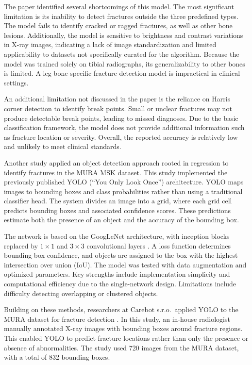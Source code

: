 \documentclass[conference]{IEEEtran}
\begin{document}
The paper identified several shortcomings of this model. The most significant limitation is its inability to detect fractures outside the three predefined types. The model fails to identify cracked or ragged fractures, as well as other bone lesions. Additionally, the model is sensitive to brightness and contrast variations in X-ray images, indicating a lack of image standardization and limited applicability to datasets not specifically curated for the algorithm. Because the model was trained solely on tibial radiographs, its generalizability to other bones is limited. A leg-bone-specific fracture detection model is impractical in clinical settings.

An additional limitation not discussed in the paper is the reliance on Harris corner detection to identify break points. Small or unclear fractures may not produce detectable break points, leading to missed diagnoses. Due to the basic classification framework, the model does not provide additional information such as fracture location or severity. Overall, the reported accuracy is relatively low and unlikely to meet clinical standards.

Another study applied an object detection approach rooted in regression to identify fractures in the MURA MSK dataset. This study implemented the previously published YOLO (``You Only Look Once'') architecture\cite{Redmon2016YOLO}. YOLO maps images to bounding boxes and class probabilities rather than using a traditional classifier head. The system divides an image into a grid, where each grid cell predicts bounding boxes and associated confidence scores. These predictions estimate both the presence of an object and the accuracy of the bounding box.

The network is based on the GoogLeNet architecture, with inception blocks replaced by $1\times1$ and $3\times3$ convolutional layers \cite{Redmon2016YOLO}. A loss function determines bounding box confidence, and objects are assigned to the box with the highest intersection over union (IoU). The model was tested with data augmentation and optimized parameters. Key strengths include implementation simplicity and computational efficiency due to the single-network design. Limitations include difficulty detecting overlapping or clustered objects.

Building on these methods, researchers at Carebot s.r.o.\ applied YOLO to the MURA dataset for fracture detection \cite{Hruby2024_cross_center_medrxiv}. In this study, an in-house radiologist manually annotated X-ray images with bounding boxes around fracture regions. This enabled YOLO to predict fracture locations rather than only the presence or absence of abnormalities. The study used 720 images from the MURA dataset, with a total of 832 bounding boxes.
\end{document}
